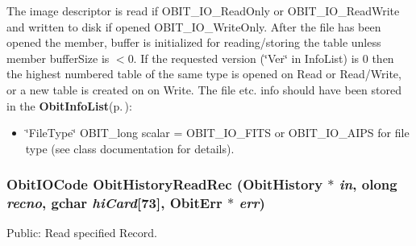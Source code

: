 The image descriptor is read if OBIT\_\-IO\_\-Read\-Only or OBIT\_\-IO\_\-Read\-Write and written to disk if opened OBIT\_\-IO\_\-Write\-Only. After the file has been opened the member, buffer is initialized for reading/storing the table unless member buffer\-Size is $<$0. If the requested version (\char`\"{}Ver\char`\"{} in Info\-List) is 0 then the highest numbered table of the same type is opened on Read or Read/Write, or a new table is created on on Write. The file etc. info should have been stored in the {\bf Obit\-Info\-List}{\rm (p.\,\pageref{structObitInfoList})}: \begin{itemize}
\item \char`\"{}File\-Type\char`\"{} OBIT\_\-long scalar = OBIT\_\-IO\_\-FITS or OBIT\_\-IO\_\-AIPS for file type (see class documentation for details). 
\end{itemize}
\subsubsection{\setlength{\rightskip}{0pt plus 5cm}Obit\-IOCode Obit\-History\-Read\-Rec ({\bf Obit\-History} $\ast$ {\em in}, {\bf olong} {\em recno}, gchar {\em hi\-Card}[73], {\bf Obit\-Err} $\ast$ {\em err})}\label{ObitHistory_8c_a17}


Public: Read specified Record. 

